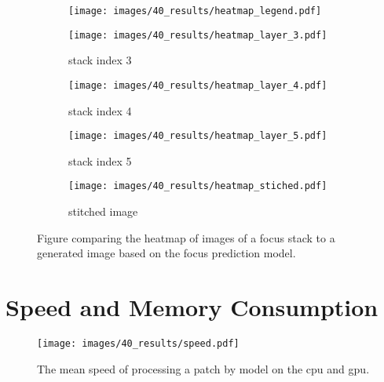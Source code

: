 \begin{figure}
    \centering
    \begin{subfigure}[b]{\textwidth}
        \centering
        \texttt{[image: images/40\_results/heatmap\_legend.pdf]}
    \end{subfigure}
    \begin{subfigure}[b]{0.5\textwidth}
        \centering
        \caption{stack index 3}
        \texttt{[image: images/40\_results/heatmap\_layer\_3.pdf]}
        \label{fig:Results:Stack:HeatMap:Stack3}
    \end{subfigure}%
    \begin{subfigure}[b]{0.5\textwidth}
        \centering
        \caption{stack index 4}
        \texttt{[image: images/40\_results/heatmap\_layer\_4.pdf]}
        \label{fig:Results:Stack:HeatMap:Stack4}
    \end{subfigure}
    \par
    \begin{subfigure}[b]{0.5\textwidth}
        \centering
        \caption{stack index 5}
        \texttt{[image: images/40\_results/heatmap\_layer\_5.pdf]}
        \label{fig:Results:Stack:HeatMap:Stack5}
    \end{subfigure}%
    \begin{subfigure}[b]{0.5\textwidth}
        \centering
        \caption{stitched image}
        \texttt{[image: images/40\_results/heatmap\_stiched.pdf]}
        \label{fig:Results:Stack:HeatMap:Stiched}
    \end{subfigure}
    \caption{Figure comparing the heatmap of images of a focus stack to a generated image based on the focus prediction model.}
    \label{fig:Results:Stack:HeatMap}
\end{figure}

\section{Speed and Memory Consumption}
\label{sec:Results:Computation}

\begin{figure}
    \centering
    \texttt{[image: images/40\_results/speed.pdf]}
    \caption{The mean speed of processing a patch by model on the \ac{cpu} and \ac{gpu}.}
    \label{fig:Results:Computation:Speed}
\end{figure}


